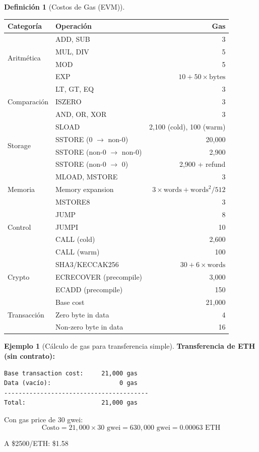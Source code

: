 \documentclass[11pt,a4paper,twoside,openright]{book}
\theoremstyle{definition}
\newtheorem{definition}{Definición}[chapter]
\newtheorem{example}{Ejemplo}[chapter]
\theoremstyle{plain}
\theoremstyle{remark}
\begin{document}
\begin{definition}[Costos de Gas (EVM)]
\begin{center}
\begin{tabular}{llr}
\toprule
\textbf{Categoría} & \textbf{Operación} & \textbf{Gas} \\
\midrule
\multirow{4}{*}{Aritmética} 
    & ADD, SUB & 3 \\
    & MUL, DIV & 5 \\
    & MOD & 5 \\
    & EXP & $10 + 50 \times \text{bytes}$ \\
\midrule
\multirow{3}{*}{Comparación}
    & LT, GT, EQ & 3 \\
    & ISZERO & 3 \\
    & AND, OR, XOR & 3 \\
\midrule
\multirow{4}{*}{Storage}
    & SLOAD & 2,100 (cold), 100 (warm) \\
    & SSTORE (0 $\to$ non-0) & 20,000 \\
    & SSTORE (non-0 $\to$ non-0) & 2,900 \\
    & SSTORE (non-0 $\to$ 0) & 2,900 + refund \\
\midrule
\multirow{3}{*}{Memoria}
    & MLOAD, MSTORE & 3 \\
    & Memory expansion & $3 \times \text{words} + \text{words}^2 / 512$ \\
    & MSTORE8 & 3 \\
\midrule
\multirow{3}{*}{Control}
    & JUMP & 8 \\
    & JUMPI & 10 \\
    & CALL (cold) & 2,600 \\
    & CALL (warm) & 100 \\
\midrule
\multirow{3}{*}{Crypto}
    & SHA3/KECCAK256 & $30 + 6 \times \text{words}$ \\
    & ECRECOVER (precompile) & 3,000 \\
    & ECADD (precompile) & 150 \\
\midrule
\multirow{3}{*}{Transacción}
    & Base cost & 21,000 \\
    & Zero byte in data & 4 \\
    & Non-zero byte in data & 16 \\
\bottomrule
\end{tabular}
\end{center}
\end{definition}

\begin{example}[Cálculo de gas para transferencia simple]
\textbf{Transferencia de ETH (sin contrato):}
\begin{verbatim}
Base transaction cost:     21,000 gas
Data (vacío):                   0 gas
----------------------------------------
Total:                     21,000 gas
\end{verbatim}

Con gas price de 30 gwei:
\[ \text{Costo} = 21,000 \times 30 \text{ gwei} = 630,000 \text{ gwei} = 0.00063 \text{ ETH} \]

A \$2500/ETH: \$1.58
\end{example}
\end{document}
